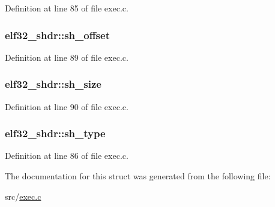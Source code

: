 Definition at line 85 of file exec.\+c.

\hypertarget{structelf32__shdr_a4dea3a6fbd3a62a649d327b515c70cd6}{
\subsubsection[{sh\+\_\+offset}]{ elf32\+\_\+shdr\+::sh\+\_\+offset}}\label{structelf32__shdr_a4dea3a6fbd3a62a649d327b515c70cd6}


Definition at line 89 of file exec.\+c.

\hypertarget{structelf32__shdr_a4addb97e16e7303912fc84daa6f3ac77}{
\subsubsection[{sh\+\_\+size}]{ elf32\+\_\+shdr\+::sh\+\_\+size}}\label{structelf32__shdr_a4addb97e16e7303912fc84daa6f3ac77}


Definition at line 90 of file exec.\+c.

\hypertarget{structelf32__shdr_ab82e07582eb07fc53eec4dca36dddc83}{
\subsubsection[{sh\+\_\+type}]{ elf32\+\_\+shdr\+::sh\+\_\+type}}\label{structelf32__shdr_ab82e07582eb07fc53eec4dca36dddc83}


Definition at line 86 of file exec.\+c.



The documentation for this struct was generated from the following file\+:\begin{DoxyCompactItemize}
\item 
src/\hyperlink{exec_8c}{exec.\+c}\end{DoxyCompactItemize}
